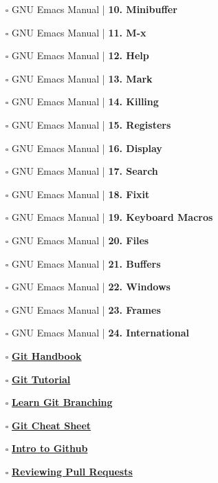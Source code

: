 \documentclass[a4, landscape, 12pt]{article}
\newcommand{\checkbox}{$\square$}%
\begin{document}
\begin{itemize}
{}
\item [\checkbox]  GNU Emacs Manual | \textbf{ 10. Minibuffer
}
\item [\checkbox]  GNU Emacs Manual | \textbf{ 11. M-x
}
\item [\checkbox]  GNU Emacs Manual | \textbf{ 12. Help
}
\item [\checkbox]  GNU Emacs Manual | \textbf{ 13. Mark
}
\item [\checkbox]  GNU Emacs Manual | \textbf{ 14. Killing
}
\item [\checkbox]  GNU Emacs Manual | \textbf{ 15. Registers
}
\item [\checkbox]  GNU Emacs Manual | \textbf{ 16. Display
}
\item [\checkbox]  GNU Emacs Manual | \textbf{ 17. Search
}
\item [\checkbox]  GNU Emacs Manual | \textbf{ 18. Fixit
}
\item [\checkbox]  GNU Emacs Manual | \textbf{ 19. Keyboard Macros
}
\item [\checkbox]  GNU Emacs Manual | \textbf{ 20. Files
}
\item [\checkbox]  GNU Emacs Manual | \textbf{ 21. Buffers
}
\item [\checkbox]  GNU Emacs Manual | \textbf{ 22. Windows
}
\item [\checkbox]  GNU Emacs Manual | \textbf{ 23. Frames
}
\item [\checkbox]  GNU Emacs Manual | \textbf{ 24. International
}
\item [\checkbox]  \href{https://guides.github.com/introduction/git-handbook/}{\textbf{Git Handbook}}

\item [\checkbox]  \href{https://git-scm.com/docs/gittutorial}{\textbf{Git Tutorial}}

\item [\checkbox]  \href{https://learngitbranching.js.org/?locale=es_AR}{\textbf{Learn Git Branching}}

\item [\checkbox]  \href{https://training.github.com/downloads/github-git-cheat-sheet/}{\textbf{Git Cheat Sheet}}

\item [\checkbox]  \href{https://lab.github.com/githubtraining/introduction-to-github}{\textbf{Intro to Github}}

\item [\checkbox]  \href{https://lab.github.com/githubtraining/reviewing-pull-requests}{\textbf{Reviewing Pull Requests}}


\end{itemize}
\end{document}
